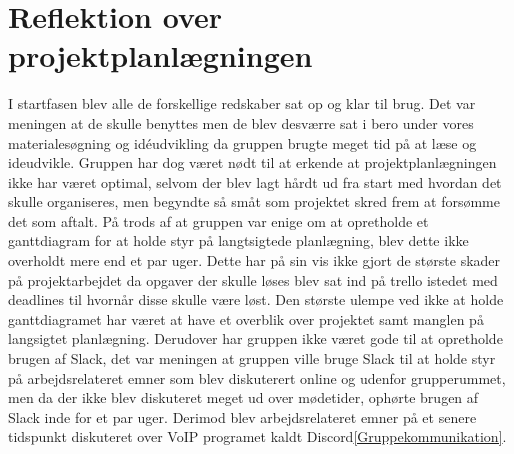 \section{Reflektion over projektplanlægningen}\label{Reflektion-over-projektplanlaegningen}
I startfasen blev alle de forskellige redskaber sat op og klar til brug. Det var meningen at de skulle benyttes men de blev desværre sat i bero under vores materialesøgning og idéudvikling da gruppen brugte meget tid på at læse og ideudvikle. Gruppen har dog været nødt til at erkende at projektplanlægningen ikke har været optimal, selvom der blev lagt hårdt ud fra start med hvordan det skulle organiseres, men begyndte så småt som projektet skred frem at forsømme det som aftalt. På trods af at gruppen var enige om at opretholde et ganttdiagram for at holde styr på langtsigtede planlægning, blev dette ikke overholdt mere end et par uger. Dette har på sin vis ikke gjort de største skader på projektarbejdet da opgaver der skulle løses blev sat ind på trello istedet med deadlines til hvornår disse skulle være løst. Den største ulempe ved ikke at holde ganttdiagramet har været at have et overblik over projektet samt manglen på langsigtet planlægning. Derudover har gruppen ikke været gode til at opretholde brugen af Slack, det var meningen at gruppen ville bruge Slack til at holde styr på arbejdsrelateret emner som blev diskuterert online og udenfor grupperummet, men da der ikke blev diskuteret meget ud over mødetider, ophørte brugen af Slack inde for et par uger. Derimod blev arbejdsrelateret emner på et senere tidspunkt diskuteret over VoIP programet kaldt Discord\ref{Gruppekommunikation}.